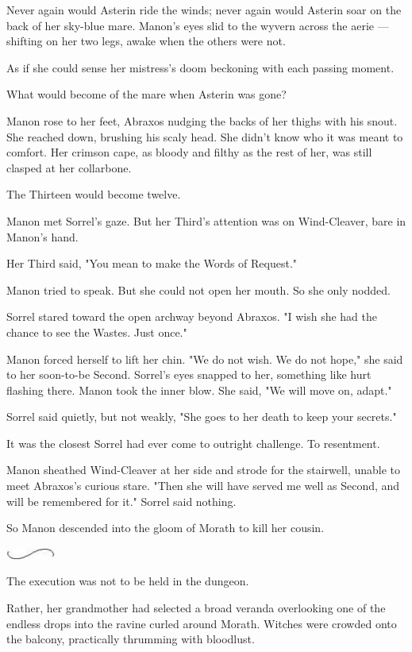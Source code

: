 Never again would Asterin ride the winds; never again would Asterin soar on the back of her sky-blue mare. Manon's eyes slid to the wyvern across the aerie ---shifting on her two legs, awake when the others were not.

As if she could sense her mistress's doom beckoning with each passing moment.

What would become of the mare when Asterin was gone?

Manon rose to her feet, Abraxos nudging the backs of her thighs with his snout. She reached down, brushing his scaly head. She didn't know who it was meant to comfort. Her crimson cape, as bloody and filthy as the rest of her, was still clasped at her collarbone.

The Thirteen would become twelve.

Manon met Sorrel's gaze. But her Third's attention was on Wind-Cleaver, bare in Manon's hand.

Her Third said, "You mean to make the Words of Request."

Manon tried to speak. But she could not open her mouth. So she only nodded.

Sorrel stared toward the open archway beyond Abraxos. "I wish she had the chance to see the Wastes. Just once."

Manon forced herself to lift her chin. "We do not wish. We do not hope," she said to her soon-to-be Second. Sorrel's eyes snapped to her, something like hurt flashing there. Manon took the inner blow. She said, "We will move on, adapt."

Sorrel said quietly, but not weakly, "She goes to her death to keep your secrets."

It was the closest Sorrel had ever come to outright challenge. To resentment.

Manon sheathed Wind-Cleaver at her side and strode for the stairwell, unable to meet Abraxos's curious stare. "Then she will have served me well as Second, and will be remembered for it." Sorrel said nothing.

So Manon descended into the gloom of Morath to kill her cousin.

\includegraphics[width=0.65in,height=0.13in]{images/seperator}

The execution was not to be held in the dungeon.

Rather, her grandmother had selected a broad veranda overlooking one of the endless drops into the ravine curled around Morath. Witches were crowded onto the balcony, practically thrumming with bloodlust.

